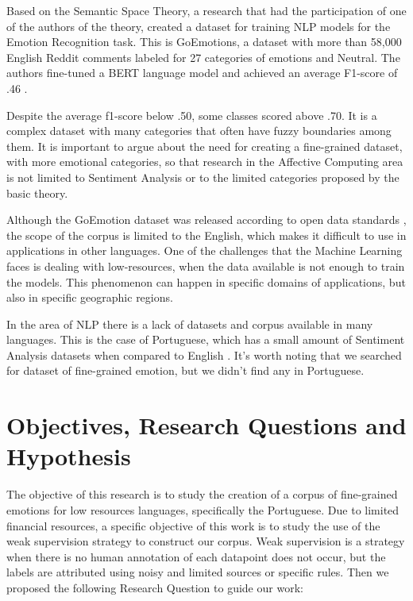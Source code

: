 \documentclass[12pt]{article}
\begin{document}
Based on the Semantic Space Theory, a research that had the participation of one of the authors of the theory, created a dataset for training NLP models for the Emotion Recognition task. This is GoEmotions, a dataset with more than 58,000 English Reddit comments labeled for 27 categories of emotions and Neutral. The authors fine-tuned a BERT language model and achieved an average F1-score of .46 \cite{Demszky2020}.

Despite the average f1-score below .50, some classes scored above .70. It is a complex dataset with many categories that often have fuzzy boundaries among them. It is important to argue about the need for creating a fine-grained dataset, with more emotional categories, so that research in the Affective Computing area is not limited to Sentiment Analysis or to the limited categories proposed by the basic theory.

Although the GoEmotion dataset was released according to open data standards \cite{Demszky2020}, the scope of the corpus is limited to the English, which makes it difficult to use in applications in other languages. One of the challenges that the Machine Learning faces is dealing with low-resources, when the data available is not enough to train the models. This phenomenon can happen in specific domains of applications, but also in specific geographic regions.

In the area of NLP there is a lack of datasets and corpus available in many languages. This is the case of Portuguese, which has a small amount of Sentiment Analysis datasets when compared to English \cite{Pereira2021}. It's worth noting that we searched for dataset of fine-grained emotion, but we didn't find any in Portuguese.

\section{Objectives, Research Questions and Hypothesis}

The objective of this research is to study the creation of a corpus of fine-grained emotions for low resources languages, specifically the Portuguese. Due to limited financial resources, a specific objective of this work is to study the use of the weak supervision strategy to construct our corpus. Weak supervision is a strategy when there is no human annotation of each datapoint does not occur, but the labels are attributed using noisy and limited sources or specific rules. Then we proposed the following Research Question to guide our work:
\end{document}
